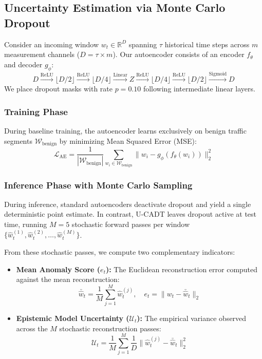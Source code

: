\documentclass[conference]{IEEEtran}
\begin{document}
\subsection{Uncertainty Estimation via Monte Carlo Dropout}
Consider an incoming window $w_t \in \mathbb{R}^D$ spanning $\tau$ historical time steps across $m$ measurement channels ($D = \tau \times m$). Our autoencoder consists of an encoder $f_\theta$ and decoder $g_\phi$:
\begin{equation}
D \xrightarrow{\text{ReLU}} \lfloor D/2 \rfloor \xrightarrow{\text{ReLU}} \lfloor D/4 \rfloor \xrightarrow{\text{Linear}} Z \xrightarrow{\text{ReLU}} \lfloor D/4 \rfloor \xrightarrow{\text{ReLU}} \lfloor D/2 \rfloor \xrightarrow{\text{Sigmoid}} D
\end{equation}
We place dropout masks with rate $p = 0.10$ following intermediate linear layers.

\subsubsection{Training Phase}
During baseline training, the autoencoder learns exclusively on benign traffic segments $\mathcal{W}_{\text{benign}}$ by minimizing Mean Squared Error (MSE):
\begin{equation}
\mathcal{L}_{\text{AE}} = \frac{1}{|\mathcal{W}_{\text{benign}}|} \sum_{w_i \in \mathcal{W}_{\text{benign}}} \| w_i - g_\phi(f_\theta(w_i)) \|_2^2
\end{equation}

\subsubsection{Inference Phase with Monte Carlo Sampling}
During inference, standard autoencoders deactivate dropout and yield a single deterministic point estimate. In contrast, U-CADT leaves dropout active at test time, running $M = 5$ stochastic forward passes per window $\{\hat{w}_t^{(1)}, \hat{w}_t^{(2)}, \dots, \hat{w}_t^{(M)}\}$. 

From these stochastic passes, we compute two complementary indicators:
\begin{itemize}
    \item \textbf{Mean Anomaly Score ($e_t$):} The Euclidean reconstruction error computed against the mean reconstruction:
    \begin{equation}
    \bar{\hat{w}}_t = \frac{1}{M} \sum_{j=1}^M \hat{w}_t^{(j)}, \quad e_t = \| w_t - \bar{\hat{w}}_t \|_2
    \end{equation}
    \item \textbf{Epistemic Model Uncertainty ($\mathcal{U}_t$):} The empirical variance observed across the $M$ stochastic reconstruction passes:
    \begin{equation}
    \mathcal{U}_t = \frac{1}{M} \sum_{j=1}^M \frac{1}{D} \| \hat{w}_t^{(j)} - \bar{\hat{w}}_t \|_2^2
    \end{equation}
\end{itemize}
\end{document}
